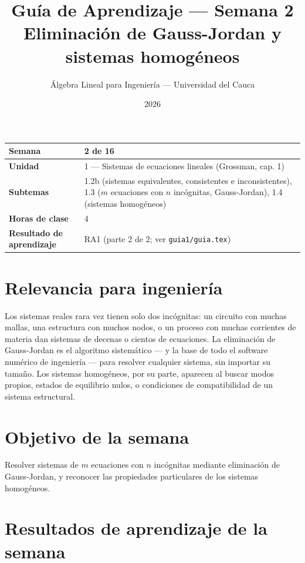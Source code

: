 \documentclass[11pt,letterpaper]{article}
\title{\textcolor{unicaucaverde}{\Large Guía de Aprendizaje — Semana 2}\\[4pt]
  \large Eliminación de Gauss-Jordan y sistemas homogéneos}
\author{Álgebra Lineal para Ingeniería --- Universidad del Cauca}
\date{2026}
\begin{document}
\maketitle

\begin{center}
\begin{tabular}{|>{\bfseries}p{4cm}|p{10cm}|}
\hline
Semana & 2 de 16 \\ \hline
Unidad & 1 --- Sistemas de ecuaciones lineales (Grossman, cap. 1) \\ \hline
Subtemas & 1.2b (sistemas equivalentes, consistentes e inconsistentes), 1.3 ($m$ ecuaciones con $n$ incógnitas, Gauss-Jordan), 1.4 (sistemas homogéneos) \\
\hline
Horas de clase & 4 \\ \hline
Resultado de aprendizaje & RA1 (parte 2 de 2; ver \texttt{guia1/guia.tex}) \\ \hline
\end{tabular}
\end{center}

\section*{Relevancia para ingeniería}

Los sistemas reales rara vez tienen solo dos incógnitas: un circuito con muchas mallas, una
estructura con muchos nodos, o un proceso con muchas corrientes de materia dan sistemas de
decenas o cientos de ecuaciones. La eliminación de Gauss-Jordan es el algoritmo sistemático
--- y la base de todo el software numérico de ingeniería --- para resolver cualquier sistema,
sin importar su tamaño. Los sistemas homogéneos, por su parte, aparecen al buscar modos propios,
estados de equilibrio nulos, o condiciones de compatibilidad de un sistema estructural.

\section{Objetivo de la semana}

Resolver sistemas de $m$ ecuaciones con $n$ incógnitas mediante eliminación de Gauss-Jordan, y
reconocer las propiedades particulares de los sistemas homogéneos.

\section{Resultados de aprendizaje de la semana}
\end{document}
